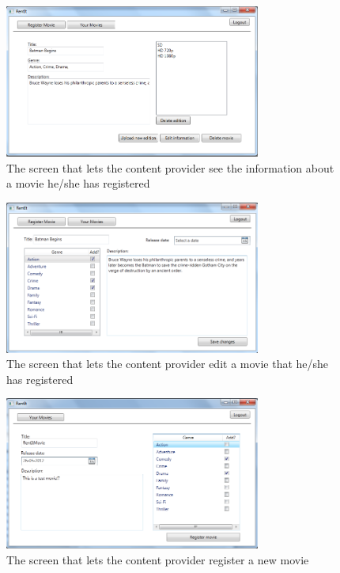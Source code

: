 \begin{figure}[h!]
  \centering
    \includegraphics[width=0.75\textwidth]{Parts/Appendix/Images/CPViewmovie}
  \caption{The screen that lets the content provider see the information about a movie he/she has registered}
  \label{fig:Appendix_GUI_PrototypeCPViewmovie}
\end{figure}

\begin{figure}[h!]
  \centering
    \includegraphics[width=0.75\textwidth]{Parts/Appendix/Images/CPEditmovie}
  \caption{The screen that lets the content provider edit a movie that he/she has registered}
  \label{fig:Appendix_GUI_PrototypeCPEditmovie}
\end{figure}

\begin{figure}[h!]
  \centering
    \includegraphics[width=0.75\textwidth]{Parts/Appendix/Images/CPRegistermovie}
  \caption{The screen that lets the content provider register a new movie}
  \label{fig:Appendix_GUI_PrototypeCPRegister}
\end{figure}

